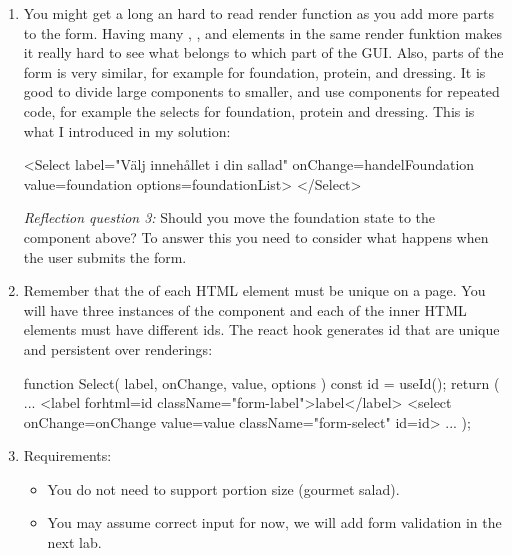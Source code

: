 \documentclass[fleqn, article, a4paper]{memoir}
\begin{document}
\begin{Assignments}
\begin{enumerate}
  \item You might get a long an hard to read render function as you add more parts to the form. Having many , , and  elements in the same render funktion makes it really hard to see what belongs to which part of the GUI. Also, parts of the form is very similar, for example  for foundation, protein, and dressing. It is good to divide large components to smaller, and use components for repeated code, for example the selects for foundation, protein and dressing. This is what I introduced in my solution:
  \begin{Code}
      <Select label="Välj innehållet i din sallad"
        onChange={handelFoundation}
        value={foundation}
        options={foundationList}>
      </Select>
  \end{Code}
  \emph{Reflection question 3:} Should you move the foundation state to the  component above? To answer this you need to consider what happens when the user submits the form.

  \item Remember that the  of each HTML element must be unique on a page. You will have three instances of the  component and each of the inner  HTML elements must have different ids. The react hook  generates id that are unique and persistent over renderings:
\begin{Code}
function Select({ label, onChange, value, options }) {
  const id = useId();
  return (
    ...
    <label forhtml={id} className="form-label">{label}</label>
    <select onChange={onChange} value={value} className="form-select" id={id}>
  ...
  );
}
\end{Code}


\item Requirements:
\begin{itemize}

  \item You do not need to support portion size (gourmet salad).

  \item You may assume correct input for now, we will add form validation in the next lab.


\end{itemize}
\end{enumerate}
\end{Assignments}
\end{document}
